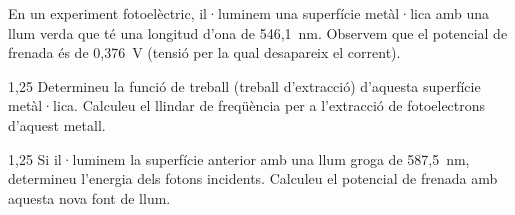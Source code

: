En un experiment fotoelèctric, il·luminem una superfície metàl·lica amb una llum verda que té una longitud d'ona de 546,1~nm. Observem que el potencial de frenada és de 0,376~V (tensió per la qual desapareix el corrent).

\begin{apartat}{1,25}
Determineu la funció de treball (treball d'extracció) d'aquesta superfície metàl·lica. Calculeu el llindar de freqüència per a l'extracció de fotoelectrons d'aquest metall.
\end{apartat}

\begin{apartat}{1,25}
Si il·luminem la superfície anterior amb una llum groga de 587,5~nm, determineu l'energia dels fotons incidents. Calculeu el potencial de frenada amb aquesta nova font de llum.
\end{apartat}

